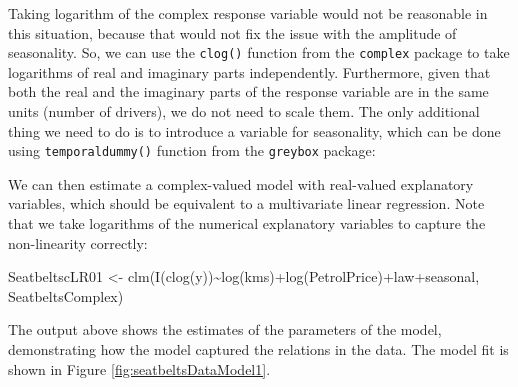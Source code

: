 \documentclass[
]{book}
\newenvironment{Shaded}{\begin{snugshade}}{\end{snugshade}}
\newcommand{\AttributeTok}[1]{\textcolor[rgb]{0.77,0.63,0.00}{#1}}
\newcommand{\ConstantTok}[1]{\textcolor[rgb]{0.00,0.00,0.00}{#1}}
\newcommand{\DecValTok}[1]{\textcolor[rgb]{0.00,0.00,0.81}{#1}}
\newcommand{\FunctionTok}[1]{\textcolor[rgb]{0.00,0.00,0.00}{#1}}
\newcommand{\NormalTok}[1]{#1}
\newcommand{\OtherTok}[1]{\textcolor[rgb]{0.56,0.35,0.01}{#1}}
\newcommand{\SpecialCharTok}[1]{\textcolor[rgb]{0.00,0.00,0.00}{#1}}
\newcommand{\StringTok}[1]{\textcolor[rgb]{0.31,0.60,0.02}{#1}}
\begin{document}
Taking logarithm of the complex response variable would not be reasonable in this situation, because that would not fix the issue with the amplitude of seasonality. So, we can use the \texttt{clog()} function from the \texttt{complex} package to take logarithms of real and imaginary parts independently. Furthermore, given that both the real and the imaginary parts of the response variable are in the same units (number of drivers), we do not need to scale them. The only additional thing we need to do is to introduce a variable for seasonality, which can be done using \texttt{temporaldummy()} function from the \texttt{greybox} package:

\begin{Shaded}
\end{Shaded}

We can then estimate a complex-valued model with real-valued explanatory variables, which should be equivalent to a multivariate linear regression. Note that we take logarithms of the numerical explanatory variables to capture the non-linearity correctly:

\begin{Shaded}
\begin{Highlighting}[]
\NormalTok{SeatbeltscLR01 }\OtherTok{\textless{}{-}}
    \FunctionTok{clm}\NormalTok{(}\FunctionTok{I}\NormalTok{(}\FunctionTok{clog}\NormalTok{(y))}\SpecialCharTok{\textasciitilde{}}\FunctionTok{log}\NormalTok{(kms)}\SpecialCharTok{+}\FunctionTok{log}\NormalTok{(PetrolPrice)}\SpecialCharTok{+}\NormalTok{law}\SpecialCharTok{+}\NormalTok{seasonal,}
\NormalTok{        SeatbeltsComplex)}
\end{Highlighting}
\end{Shaded}

The output above shows the estimates of the parameters of the model, demonstrating how the model captured the relations in the data. The model fit is shown in Figure \ref{fig:seatbeltsDataModel1}.
\end{document}

